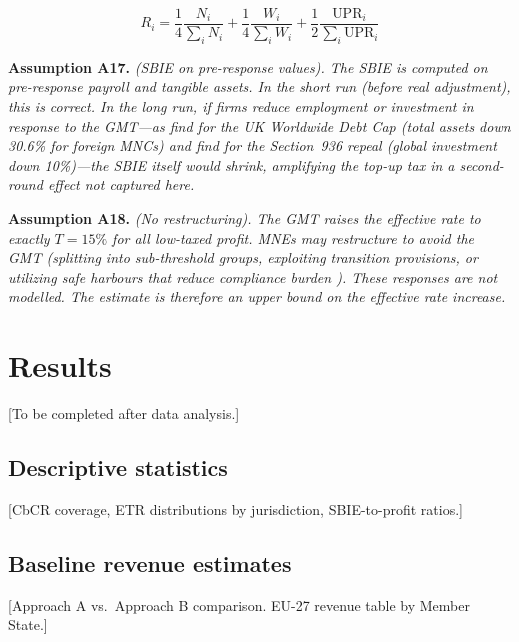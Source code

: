\documentclass[11pt,a4paper]{article}
\newcommand{\assumption}[2]{\noindent\textbf{Assumption #1.} \textit{#2}\medskip}
\begin{document}
\begin{equation}\label{eq:reallocation}
R_i = \frac{1}{4}\frac{N_i}{\sum_i N_i} + \frac{1}{4}\frac{W_i}{\sum_i W_i} + \frac{1}{2}\frac{\text{UPR}_i}{\sum_i \text{UPR}_i}
\end{equation}

\assumption{A17}{(SBIE on pre-response values). The SBIE is computed on pre-response payroll and tangible assets. In the short run (before real adjustment), this is correct. In the long run, if firms reduce employment or investment in response to the GMT---as \citet{bilicka2022} find for the UK Worldwide Debt Cap (total assets down 30.6\% for foreign MNCs) and \citet{suarezserrato2018} find for the Section~936 repeal (global investment down 10\%)---the SBIE itself would shrink, amplifying the top-up tax in a second-round effect not captured here.}

\assumption{A18}{(No restructuring). The GMT raises the effective rate to exactly $T = 15\%$ for all low-taxed profit. MNEs may restructure to avoid the GMT (splitting into sub-threshold groups, exploiting transition provisions, or utilizing safe harbours that reduce compliance burden \citep{schanz2023}). These responses are not modelled. The estimate is therefore an upper bound on the effective rate increase.}


\newpage
\section{Results}\label{sec:results}

[To be completed after data analysis.]

\subsection{Descriptive statistics}\label{sec:descriptive}

[CbCR coverage, ETR distributions by jurisdiction, SBIE-to-profit ratios.]

\subsection{Baseline revenue estimates}\label{sec:baseline_results}

[Approach A vs.\ Approach B comparison. EU-27 revenue table by Member State.]
\end{document}
